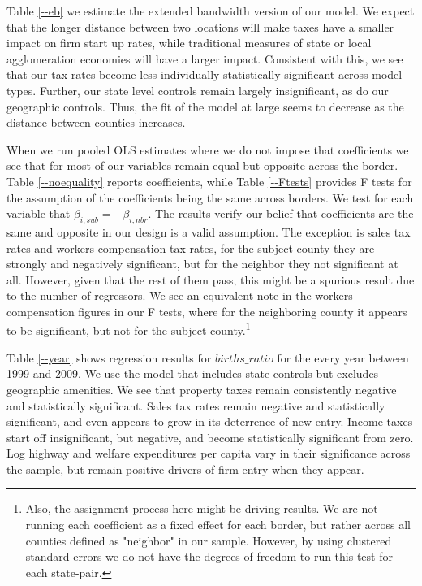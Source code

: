 Table \ref{--eb} we estimate the extended bandwidth version of our model. We expect that the longer distance between two locations will make taxes have a smaller impact on firm start up rates, while traditional measures of state or local agglomeration economies will have a larger impact. Consistent with this, we see that our tax rates become less individually statistically significant across model types. Further, our state level controls remain largely insignificant, as do our geographic controls. Thus, the fit of the model at large seems to decrease as the distance between counties increases.

When we run pooled OLS estimates where we do not impose that coefficients we see that for most of our variables remain equal but opposite across the border. Table \ref{--noequality} reports coefficients, while Table \ref{--Ftests} provides F tests for the assumption of the coefficients being the same across borders. We test for each variable that $\beta_{i,sub} = - \beta_{i,nbr}$. The results verify our belief that coefficients are the same and opposite in our design is a valid assumption. The exception is sales tax rates and workers compensation tax rates, for the subject county they are strongly and negatively significant, but for the neighbor they not significant at all. However, given that the rest of them pass, this might be a spurious result due to the number of regressors. We see an equivalent note in the workers compensation figures in our F tests, where for the neighboring county it appears to be significant, but not for the subject county.\footnote{Also, the assignment process here might be driving results. We are not running each coefficient as a fixed effect for each border, but rather across all counties defined as "neighbor" in our sample. However, by using clustered standard errors we do not have the degrees of freedom to run this test for each state-pair.} 

Table \ref{--year} shows regression results for $births\_ratio$ for the every year between 1999 and 2009. We use the model that includes state controls but excludes geographic amenities. We see that property taxes remain consistently negative and statistically significant. Sales tax rates remain negative and statistically significant, and even appears to grow in its deterrence of new entry. Income taxes start off insignificant, but negative, and become statistically significant from zero. Log highway and welfare expenditures per capita vary in their significance across the sample, but remain positive drivers of firm entry when they appear.

